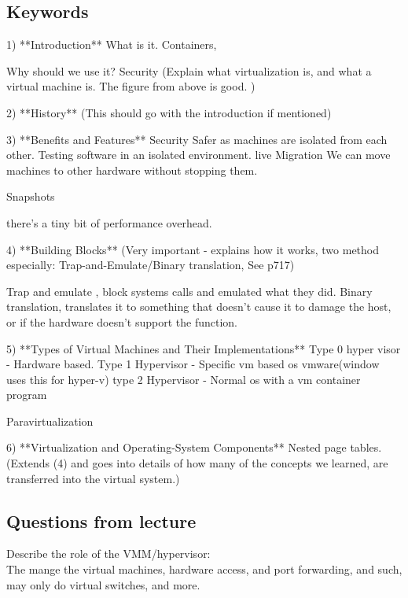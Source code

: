 \documentclass[a4paper,10pt,titlepage]{report}
\begin{document}
\subsection{Keywords}
1) **Introduction** 
		What is it.
			Containers, 
		
		Why should we use it?
		Security
		(Explain what virtualization is, and what a virtual machine is. The figure from above is good. )
		
		
2) **History** 
		(This should go with the introduction if mentioned)
		
		
		
3) **Benefits and Features** 
	Security
		Safer as machines are isolated from each other.
	Testing software in an isolated environment.
	live Migration We can move machines to other hardware without stopping them.
		
	Snapshots
	
	there's a tiny bit of performance overhead.
		
		
4) **Building Blocks** 
		(Very important - explains how it works, two method especially: Trap-and-Emulate/Binary translation, See p717)
		
		Trap and emulate , block systems calls and emulated what they did.
		Binary translation, translates it to something that doesn't cause it to damage the host, or if the hardware doesn't support the function.
		
		
		
		
5) **Types of Virtual Machines and Their Implementations** 
		Type 0 hyper visor - Hardware based.
		Type 1 Hypervisor  - Specific vm based os vmware(window uses this for hyper-v)
		type 2 Hypervisor  - Normal os with a vm container program
		
		Paravirtualization 
		
		
6) **Virtualization and Operating-System Components** 
		Nested page tables.
		(Extends (4) and goes into details of how many of the concepts we learned, are transferred into the virtual system.)


\subsection{Questions from lecture}
Describe the role of the VMM/hypervisor:\\
	The mange the virtual machines, hardware access, and port forwarding, and such, may only do virtual switches, and more.\\

	
\end{document}
